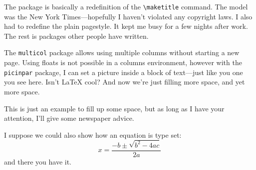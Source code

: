 \documentclass{article}
\date{\today}
\begin{document}
\maketitle

\begin{multicols}{3}


The package is basically a redefinition of the \verb+\maketitle+ command.  The model was the New York Times---hopefully I haven't violated any copyright laws.  I also had to redefine the plain pagestyle.  It kept me busy for a few nights after work.  The rest is packages other people have written.      

\begin{window} The \verb+multicol+ package allows using multiple columns without starting a new page.  Using floats is not possible in a columns environment, however with the \verb+picinpar+ package, I can set a picture inside a block of text---just like you one you see here.  Isn't \LaTeX{} cool?
And now we're just filling more space, and yet more space.  
\end{window}
\closearticle


This is just an example to fill up some space, but as long as I have your attention, I'll give some newspaper advice.

I suppose we could also show how an equation is type set:
\begin{displaymath}
x=\frac{-b\pm\sqrt{b^2-4ac}}{2a}
\end{displaymath}
and there you have it.  

\lipsum[1-4]

\closearticle

\end{multicols}
\end{document}

